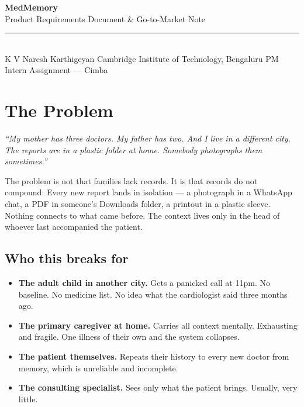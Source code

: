 \documentclass[11pt, a4paper]{article}
\begin{document}
\begin{center}
  {\LARGE\textbf{MedMemory}}\\[4pt]
  {\large Product Requirements Document \& Go-to-Market Note}\\[6pt]
  \rule{\linewidth}{0.6pt}\\[4pt]
  {\small K V Naresh Karthigeyan \quad\textbar\quad Cambridge Institute of Technology, Bengaluru \quad\textbar\quad PM Intern Assignment --- Cimba}
\end{center}

\vspace{6pt}

\section{The Problem}

\textit{``My mother has three doctors. My father has two. And I live in a different city. The reports are in a plastic folder at home. Somebody photographs them sometimes.''}

\vspace{4pt}

The problem is not that families lack records. It is that records do not compound. Every new report lands in isolation --- a photograph in a WhatsApp chat, a PDF in someone's Downloads folder, a printout in a plastic sleeve. Nothing connects to what came before. The context lives only in the head of whoever last accompanied the patient.

\subsection{Who this breaks for}

\begin{itemize}
  \item \textbf{The adult child in another city.} Gets a panicked call at 11pm. No baseline. No medicine list. No idea what the cardiologist said three months ago.
  \item \textbf{The primary caregiver at home.} Carries all context mentally. Exhausting and fragile. One illness of their own and the system collapses.
  \item \textbf{The patient themselves.} Repeats their history to every new doctor from memory, which is unreliable and incomplete.
  \item \textbf{The consulting specialist.} Sees only what the patient brings. Usually, very little.
\end{itemize}
\end{document}
